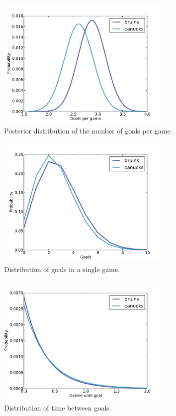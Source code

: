 \documentclass[12pt]{book}
\begin{document}
\begin{figure}
\centerline{\includegraphics[height=2.5in]{figs/hockey1.pdf}}
\caption{Posterior distribution of the number of
goals per game.}
\label{fig.hockey1}
\end{figure}

\begin{figure}
\centerline{\includegraphics[height=2.5in]{figs/hockey2.pdf}}
\caption{Distribution of goals in a single game.}
\label{fig.hockey2}
\end{figure}

\begin{figure}
\centerline{\includegraphics[height=2.5in]{figs/hockey3.pdf}}
\caption{Distribution of time between goals.}
\label{fig.hockey3}
\end{figure}
\end{document}
